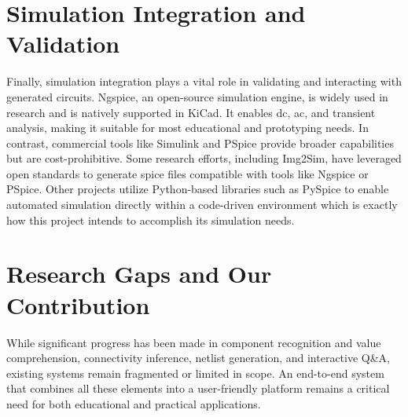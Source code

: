 \section{Simulation Integration and Validation}

Finally, simulation integration plays a vital role in validating and interacting with generated circuits. Ngspice, an open-source simulation engine, is widely used in research and is natively supported in KiCad. It enables \gls{dc}, \gls{ac}, and transient analysis, making it suitable for most educational and prototyping needs. In contrast, commercial tools like Simulink and PSpice provide broader capabilities but are cost-prohibitive. Some research efforts, including Img2Sim, have leveraged open standards to generate \gls{spice} files compatible with tools like Ngspice or PSpice. Other projects utilize Python-based libraries such as PySpice to enable automated simulation directly within a code-driven environment which is exactly how this project intends to accomplish its simulation needs.

\section{Research Gaps and Our Contribution}

While significant progress has been made in component recognition and value comprehension, connectivity inference, netlist generation, and interactive Q\&A, existing systems remain fragmented or limited in scope. An end-to-end system that combines all these elements into a user-friendly platform remains a critical need for both educational and practical applications.